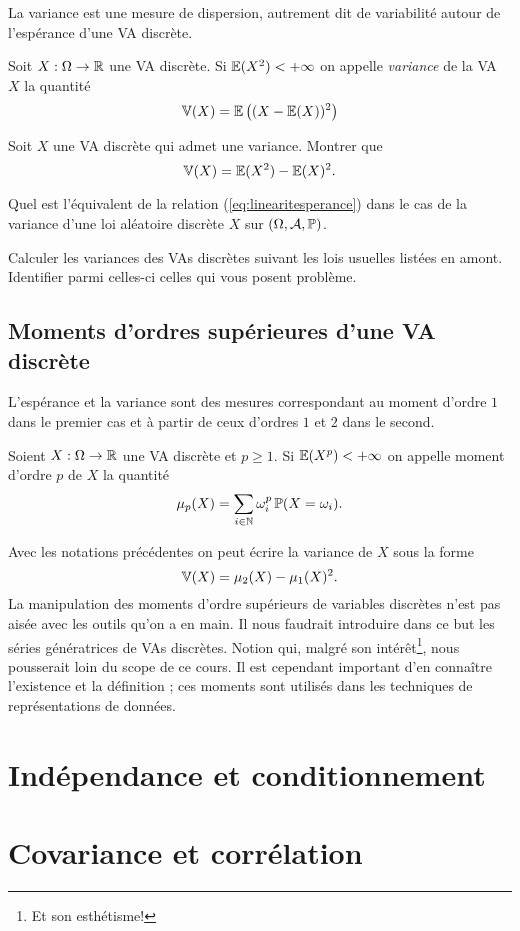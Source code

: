 \documentclass[11pt, a4paper]{article}
\begin{document}
La variance est une mesure de dispersion, autrement dit de variabilité
autour de l'espérance d'une VA discrète.
\begin{defn}
  Soit $X : \Omega \to \mathbb{R}$ une VA discrète. Si $\operatorname{\mathbb{E}}(X^2) < + \infty$
  on appelle \emph{variance} de la VA $X$ la quantité
  \[
    \operatorname{\mathbb{V}}(X) = \operatorname{\mathbb{E}}\big( (X- \operatorname{\mathbb{E}}(X))^2\big)
  \]
\end{defn}
\begin{question}
  Soit $X$ une VA discrète qui admet une variance. Montrer que
  \[
    \operatorname{\mathbb{V}}(X) = \operatorname{\mathbb{E}}(X^2) - \operatorname{\mathbb{E}}(X)^2.
  \]
\end{question}
\begin{question}
  Quel est l'équivalent de la relation (\ref{eq:linearitesperance})
  dans le cas de la variance d'une loi aléatoire discrète $X$ sur
  $(\Omega, \mathcal{A}, \operatorname{\mathbb{P}})$.
\end{question}
\begin{question}
  Calculer les variances des VAs discrètes suivant les lois usuelles
  listées en amont. Identifier parmi celles-ci celles qui vous posent
  problème.
\end{question}

\subsection{Moments d'ordres supérieures d'une VA discrète}
\label{sec:momentsups}

L'espérance et la variance sont des mesures correspondant au moment
d'ordre $1$ dans le premier cas et à partir de ceux d'ordres $1$ et
$2$ dans le second.
\begin{defn}
  Soient $X : \Omega \to \mathbb{R}$ une VA discrète et $p \geq 1$. Si
  $\operatorname{\mathbb{E}}(X^p) < +\infty$ on appelle moment d'ordre $p$ de $X$ la
  quantité
  \[
    \mu_p(X) = \sum_{i \in \mathbb{N}}\omega_i^p\operatorname{\mathbb{P}}(X = \omega_i).
  \]
\end{defn}
Avec les notations précédentes on peut écrire la variance de $X$ sous
la forme
\[
  \operatorname{\mathbb{V}}(X) = \mu_2(X) - \mu_1(X)^2.
\]
La manipulation des moments d'ordre supérieurs de variables discrètes
n'est pas aisée avec les outils qu'on a en main. Il nous faudrait
introduire dans ce but les séries génératrices de VAs
discrètes. Notion qui, malgré son intérêt\footnote{Et son
  esthétisme!}, nous pousserait loin du scope de ce cours. Il est
cependant important d'en connaître l'existence et la définition ; ces
moments sont utilisés dans les techniques de représentations de
données.

\section{Indépendance et conditionnement}
\label{sec:independanceetconditionnement}

\section{Covariance et corrélation}
\label{sec:convarianceetcorrelation}




\end{document}
